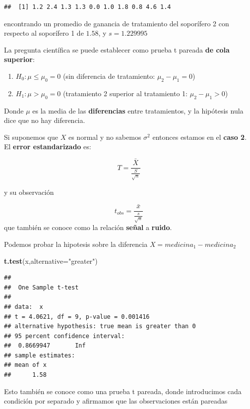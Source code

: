 \documentclass[
]{book}
\newenvironment{Shaded}{\begin{snugshade}}{\end{snugshade}}
\newcommand{\AttributeTok}[1]{\textcolor[rgb]{0.13,0.29,0.53}{#1}}
\newcommand{\FunctionTok}[1]{\textcolor[rgb]{0.13,0.29,0.53}{\textbf{#1}}}
\newcommand{\NormalTok}[1]{#1}
\newcommand{\StringTok}[1]{\textcolor[rgb]{0.31,0.60,0.02}{#1}}
\providecommand{\tightlist}{%
  \setlength{\itemsep}{0pt}\setlength{\parskip}{0pt}}
\begin{document}
\begin{verbatim}
##  [1] 1.2 2.4 1.3 1.3 0.0 1.0 1.8 0.8 4.6 1.4
\end{verbatim}

encontrando un promedio de ganancia de tratamiento del soporífero 2 con respecto al soporífero 1 de \(1.58\), y \(s=1.229995\)

La pregunta científica se puede establecer como prueba t pareada \textbf{de cola superior}:

\begin{enumerate}
\def\labelenumi{\alph{enumi}.}
\tightlist
\item
  \(H_0:\mu \leq \mu_0=0\) (sin diferencia de tratamiento: \(\mu_2-\mu_1=0\))
\item
  \(H_1:\mu > \mu_0= 0\) (tratamiento 2 superior al tratamiento 1: \(\mu_2-\mu_1>0\))
\end{enumerate}

Donde \(\mu\) es la media de las \textbf{diferencias} entre tratamientos, y la hipótesis nula dice que no hay diferencia.

Si suponemos que \(X\) es normal y no sabemos \(\sigma^2\) entonces estamos en el \textbf{caso 2}. El \textbf{error estandarizado} es:

\[T=\frac{\bar{X}}{\frac{S}{\sqrt{n}}}\]

y su observación

\[t_{obs}=\frac{\bar{x}}{\frac{s}{\sqrt{n}}}\]
que también se conoce como la relación \textbf{señal} a \textbf{ruido}.

Podemos probar la hipotesis sobre la diferencia \(X=medicina_1-medicina_2\)

\begin{Shaded}
\begin{Highlighting}[]
\FunctionTok{t.test}\NormalTok{(x,}\AttributeTok{alternative=}\StringTok{"greater"}\NormalTok{)}
\end{Highlighting}
\end{Shaded}

\begin{verbatim}
## 
##  One Sample t-test
## 
## data:  x
## t = 4.0621, df = 9, p-value = 0.001416
## alternative hypothesis: true mean is greater than 0
## 95 percent confidence interval:
##  0.8669947       Inf
## sample estimates:
## mean of x 
##      1.58
\end{verbatim}

Esto también se conoce como una prueba t pareada, donde introducimos cada condición por separado y afirmamos que las observaciones están pareadas
\end{document}
